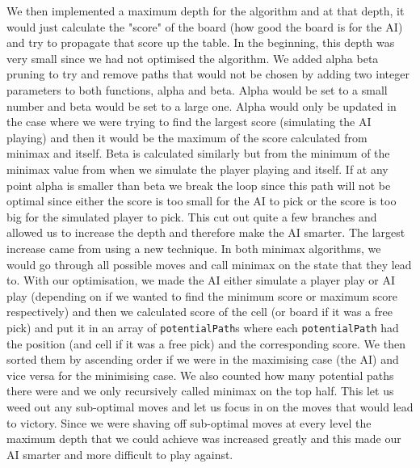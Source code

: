 \documentclass[10pt]{article}
\begin{document}
We then implemented a maximum depth for the algorithm and at that depth, it would just calculate the "score" of the board (how good the board is for the AI) and try to propagate that score up the table. In the beginning, this depth was very small since we had not optimised the algorithm. We added alpha beta pruning to try and remove paths that would not be chosen by adding two integer parameters to both functions, alpha and beta. Alpha would be set to a small number and beta would be set to a large one. Alpha would only be updated in the case where we were trying to find the largest score (simulating the AI playing) and then it would be the maximum of the score calculated from minimax and itself. Beta is calculated similarly but from the minimum of the minimax value from when we simulate the player playing and itself. If at any point alpha is smaller than beta we break the loop since this path will not be optimal since either the score is too small for the AI to pick or the score is too big for the simulated player to pick. This cut out quite a few branches and allowed us to increase the depth and therefore make the AI smarter. The largest increase came from using a new technique. In both minimax algorithms, we would go through all possible moves and call minimax on the state that they lead to. With our optimisation, we made the AI either simulate a player play or AI play (depending on if we wanted to find the minimum score or maximum score respectively) and then we calculated score of the cell (or board if it was a free pick) and put it in an array of {\tt{potentialPath}}s where each {\tt{potentialPath}} had the position (and cell if it was a free pick) and the corresponding score. We then sorted them by ascending order if we were in the maximising case (the AI) and vice versa for the minimising case. We also counted how many potential paths there were and we only recursively called minimax on the top half. This let us weed out any sub-optimal moves and let us focus in on the moves that would lead to victory. Since we were shaving off sub-optimal moves at every level the maximum depth that we could achieve was increased greatly and this made our AI smarter and more difficult to play against.
\end{document}
